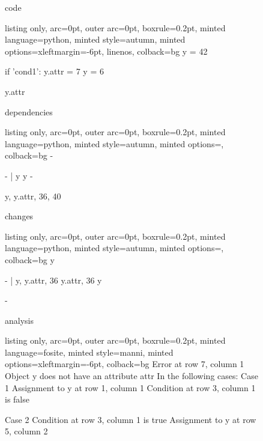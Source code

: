 \begin{figure}[!h]
 \begin{minipage}{0.32\textwidth}
 code
 \vspace{2pt}
  \begin{tcblisting}{listing only, 
    arc=0pt,
    outer arc=0pt, 
    boxrule=0.2pt,
    minted language=python,
    minted style=autumn,
    minted options={xleftmargin=-6pt, linenos},
    colback=bg }
y = 42

if 'cond1':
  y.attr = 7
  y = 6

y.attr
\end{tcblisting}
 \end{minipage}
 \begin{minipage}{0.32\textwidth}
 dependencies
  \begin{tcblisting}{listing only, 
    arc=0pt,
    outer arc=0pt, 
    boxrule=0.2pt,
    minted language=python,
    minted style=autumn,
    minted options={},
    colback=bg }
-

- | y
    y
    -

y, y.attr, 36, 40
\end{tcblisting}
 \end{minipage}
 \begin{minipage}{0.32\textwidth}
 changes
  \begin{tcblisting}{listing only, 
    arc=0pt,
    outer arc=0pt, 
    boxrule=0.2pt,
    minted language=python,
    minted style=autumn,
    minted options={},
    colback=bg }
y

- | y, y.attr, 36
    y.attr, 36
    y

-
\end{tcblisting}
 \end{minipage}
 \begin{minipage}{\textwidth}
  \vspace{4pt}
  analysis
  \begin{tcblisting}{listing only, 
    arc=0pt,
    outer arc=0pt, 
    boxrule=0.2pt,
    minted language=fosite,
    minted style=manni,
    minted options={xleftmargin=-6pt},
    colback=bg }
Error at row 7, column 1
 Object y does not have an attribute attr
 In the following cases:
 Case 1
  Assignment to y at row 1, column 1
  Condition at row 3, column 1 is false

 Case 2
  Condition at row 3, column 1 is true
  Assignment to y at row 5, column 2
\end{tcblisting}
 \end{minipage}
 \label{lst:assign}
\end{figure}

